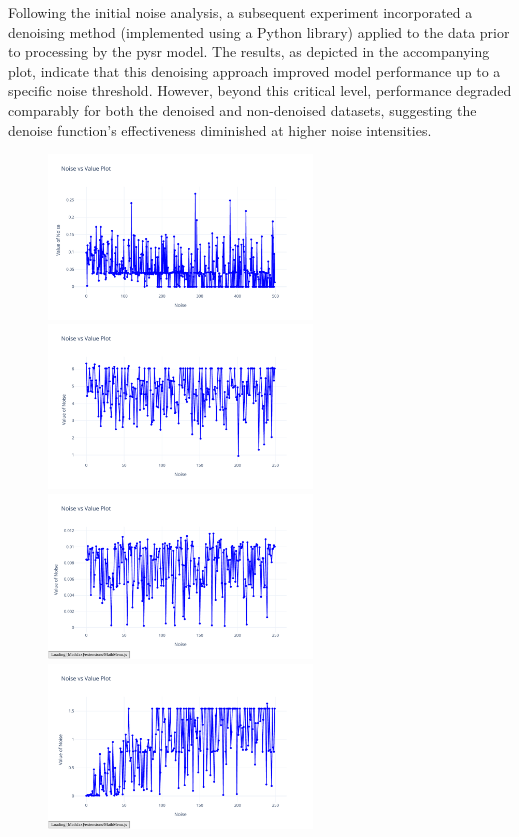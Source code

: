 \documentclass{article}
\begin{document}
    Following the initial noise analysis, a subsequent experiment incorporated a denoising method (implemented using a Python library) applied to the data prior to processing by the pysr model. The results, as depicted in the accompanying plot, indicate that this denoising approach improved model performance up to a specific noise threshold. However, beyond this critical level, performance degraded comparably for both the denoised and non-denoised datasets, suggesting the denoise function's effectiveness diminished at higher noise intensities.\\


\begin{figure}[H]
    \centering
    \includegraphics[width=7cm]{noise_conservation_d_r}
    \includegraphics[width=7cm]{noise_Newtons_First_Law_d_r}
    \includegraphics[width=7cm]{noise_Newtons_Second_Law_d_r}
    \includegraphics[width=7cm]{noise_Newtons_Third_Law_d_r}

\end{figure}
\end{document}
